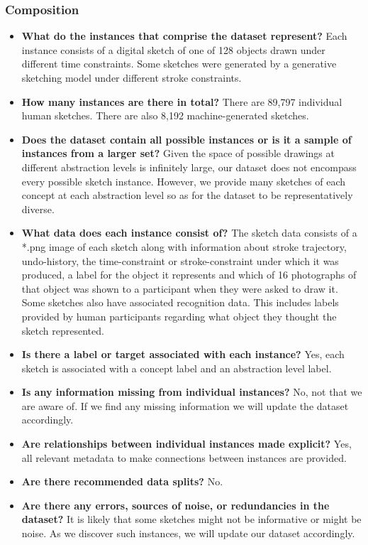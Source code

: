 \documentclass{article}
\begin{document}
\subsubsection{Composition}
\begin{itemize}
    \item \textbf{ What do the instances that comprise the dataset represent?} Each instance consists of a digital sketch of one of 128 objects drawn under different time constraints. Some sketches were generated by a generative sketching model under different stroke constraints.
    \item \textbf{How many instances are there in total?} There are 89,797 individual human sketches. There are also 8,192 machine-generated sketches.
    \item \textbf{Does the dataset contain all possible instances or is it a sample of instances from a larger set?} Given the space of possible drawings at different abstraction levels is infinitely large, our dataset does not encompass every possible sketch instance. However, we provide many sketches of each concept at each abstraction level so as for the dataset to be representatively diverse.
    \item \textbf{What data does each instance consist of?} The sketch data consists of a *.png image of each sketch along with information about stroke trajectory, undo-history, the time-constraint or stroke-constraint under which it was produced, a label for the object it represents and which of 16 photographs of that object was shown to a participant when they were asked to draw it.
    Some sketches also have associated recognition data. This includes labels provided by human participants regarding what object they thought the sketch represented.
    \item \textbf{ Is there a label or target associated with each instance?} Yes, each sketch is associated with a concept label and an abstraction level label.
    \item  \textbf{Is any information missing from individual instances?} No, not that we are aware of. If we find any missing information we will update the dataset accordingly.
    \item \textbf{ Are relationships between individual instances made explicit?} Yes, all relevant metadata to make connections between instances are provided.
    \item \textbf{Are there recommended data splits?} No.

    \item \textbf{Are there any errors, sources of noise, or redundancies in the dataset?} It is likely that some sketches might not be informative or might be noise. As we discover such instances, we will update our dataset accordingly.


\end{itemize}
\end{document}

